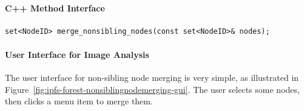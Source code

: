 \paragraph{C++ Method Interface}

\begin{lstlisting}[style=Prototype]
set<NodeID> merge_nonsibling_nodes(const set<NodeID>& nodes);
\end{lstlisting}

\paragraph{User Interface for Image Analysis}

The user interface for non-sibling node merging is very simple, as illustrated in Figure~\ref{fig:ipfs-forest-nonsiblingnodemerging-gui}. The user selects some nodes, then clicks a menu item to merge them.

